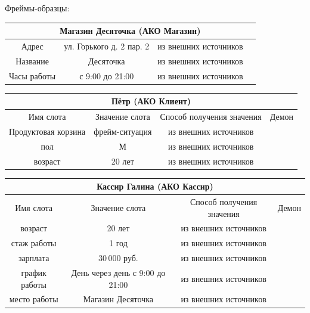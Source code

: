 \documentclass[14pt, a4paper, titlepage]{extarticle}
\begin{document}
Фреймы-образцы:

\begin{table}[H]
	\begin{adjustbox}{width=\columnwidth,center}
		\begin{tabular}{cccc}
			\toprule
			\multicolumn{4}{c}{Магазин Десяточка (АКО Магазин)} \\
			\midrule
			Адрес & ул. Горького д. 2 пар. 2 & из внешних источников & \\
			Название & Десяточка & из внешних источников & \\
			Часы работы & с 9:00 до 21:00 & из внешних источников & \\
			\bottomrule
		\end{tabular}
	\end{adjustbox}
\end{table}

\begin{table}[H]
	\begin{adjustbox}{width=\columnwidth,center}
		\begin{tabular}{cccc}
			\toprule
			\multicolumn{4}{c}{Пётр (АКО Клиент)} \\
			\midrule
			Имя слота & Значение слота & Способ получения значения & Демон
			\\\midrule
			
			Продуктовая корзина & фрейм-ситуация & из внешних источников & \\
			пол & М & из внешних источников & \\
			возраст & 20 лет & из внешних источников & \\
			\bottomrule
		\end{tabular}
	\end{adjustbox}
\end{table}

\begin{table}[H]
	\begin{adjustbox}{width=\columnwidth,center}
		\begin{tabular}{cccc}
			\toprule
			\multicolumn{4}{c}{Кассир Галина (АКО Кассир)} \\
			\midrule
			Имя слота & Значение слота & Способ получения значения & Демон
			\\\midrule
			
			возраст & 20 лет & из внешних источников & \\
			стаж работы & 1 год & из внешних источников & \\
			зарплата & 30\,000 руб. & из внешних источников & \\
			график работы & День через день с 9:00 до 21:00 & из внешних источников & \\
			место работы & Магазин Десяточка & из внешних источников & \\
			
			\bottomrule
		\end{tabular}
	\end{adjustbox}
\end{table}
\end{document}
